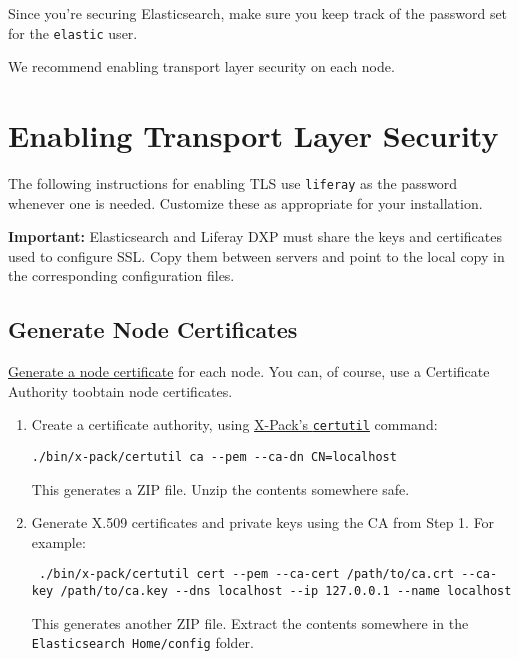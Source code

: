 Since you're securing Elasticsearch, make sure you keep track of the
password set for the \texttt{elastic} user.

We recommend enabling transport layer security on each node.

\section{Enabling Transport Layer
Security}\label{enabling-transport-layer-security-1}

The following instructions for enabling TLS use \texttt{liferay} as the
password whenever one is needed. Customize these as appropriate for your
installation.

\noindent\hrulefill

\textbf{Important:} Elasticsearch and Liferay DXP must share the keys
and certificates used to configure SSL. Copy them between servers and
point to the local copy in the corresponding configuration files.

\noindent\hrulefill

\subsection{Generate Node
Certificates}\label{generate-node-certificates-1}

\href{https://www.elastic.co/guide/en/elasticsearch/reference/6.1/configuring-tls.html\#node-certificates}{Generate
a node certificate} for each node. You can, of course, use a Certificate
Authority toobtain node certificates.

\begin{enumerate}
\def\labelenumi{\arabic{enumi}.}
\item
  Create a certificate authority, using
  \href{https://www.elastic.co/guide/en/elasticsearch/reference/6.1/certutil.html}{X-Pack's
  \texttt{certutil}} command:

\begin{verbatim}
./bin/x-pack/certutil ca --pem --ca-dn CN=localhost
\end{verbatim}

  This generates a ZIP file. Unzip the contents somewhere safe.
\item
  Generate X.509 certificates and private keys using the CA from Step 1.
  For example:

\begin{verbatim}
 ./bin/x-pack/certutil cert --pem --ca-cert /path/to/ca.crt --ca-key /path/to/ca.key --dns localhost --ip 127.0.0.1 --name localhost
\end{verbatim}

  This generates another ZIP file. Extract the contents somewhere in the
  \texttt{Elasticsearch\ Home/config} folder.
\end{enumerate}

